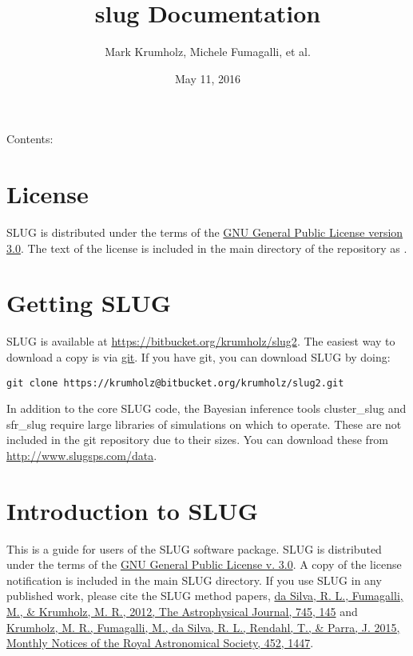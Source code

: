 \documentclass[letterpaper,10pt,english]{sphinxmanual}
\title{slug Documentation}
\date{May 11, 2016}
\author{Mark Krumholz, Michele Fumagalli, et al.}
\begin{document}
\maketitle
\tableofcontents
{}\label{index::doc}


Contents:


\chapter{License}
\label{license::doc}\label{license:welcome-to-slug-s-documentation}\label{license:license}
SLUG is distributed under the terms of the \href{http://www.gnu.org/copyleft/gpl.html}{GNU General Public License version 3.0}. The text of the license is included in the main directory of the repository as .


\chapter{Getting SLUG}
\label{getting:getting-slug}\label{getting::doc}
SLUG is available at \href{https://bitbucket.org/krumholz/slug2}{https://bitbucket.org/krumholz/slug2}. The easiest way to download a copy is via \href{http://git-scm.com/}{git}. If you have git, you can download SLUG by doing:

\begin{Verbatim}[commandchars=\\\{\}]
git clone https://krumholz@bitbucket.org/krumholz/slug2.git
\end{Verbatim}

In addition to the core SLUG code, the Bayesian inference tools cluster\_slug and sfr\_slug require large libraries of simulations on which to operate. These are not included in the git repository due to their sizes. You can download these from \href{http://www.slugsps.com/data}{http://www.slugsps.com/data}.


\chapter{Introduction to SLUG}
\label{intro:introduction-to-slug}\label{intro::doc}
This is a guide for users of the SLUG software package. SLUG is distributed under the terms of the \href{http://www.gnu.org/licenses/gpl.html}{GNU General Public License v. 3.0}. A copy of the license notification is included in the main SLUG directory. If you use SLUG in any published work, please cite the SLUG method papers, \href{http://adsabs.harvard.edu/abs/2012ApJ...745..145D}{da Silva, R. L., Fumagalli, M., \& Krumholz, M. R., 2012, The Astrophysical Journal, 745, 145} and \href{http://adsabs.harvard.edu/abs/2015MNRAS.452.1447K}{Krumholz, M. R., Fumagalli, M., da Silva, R. L., Rendahl, T., \& Parra, J. 2015, Monthly Notices of the Royal Astronomical Society, 452, 1447}.
\end{document}
